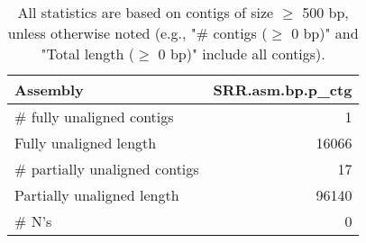 \documentclass[12pt,a4paper]{article}
\begin{document}
\begin{table}[ht]
\begin{center}
\caption{All statistics are based on contigs of size $\geq$ 500 bp, unless otherwise noted (e.g., "\# contigs ($\geq$ 0 bp)" and "Total length ($\geq$ 0 bp)" include all contigs).}
\begin{tabular}{|l*{1}{|r}|}
\hline
Assembly & SRR.asm.bp.p\_ctg \\ \hline
\# fully unaligned contigs & 1 \\ \hline
Fully unaligned length & 16066 \\ \hline
\# partially unaligned contigs & 17 \\ \hline
Partially unaligned length & 96140 \\ \hline
\# N's & 0 \\ \hline
\end{tabular}
\end{center}
\end{table}
\end{document}
